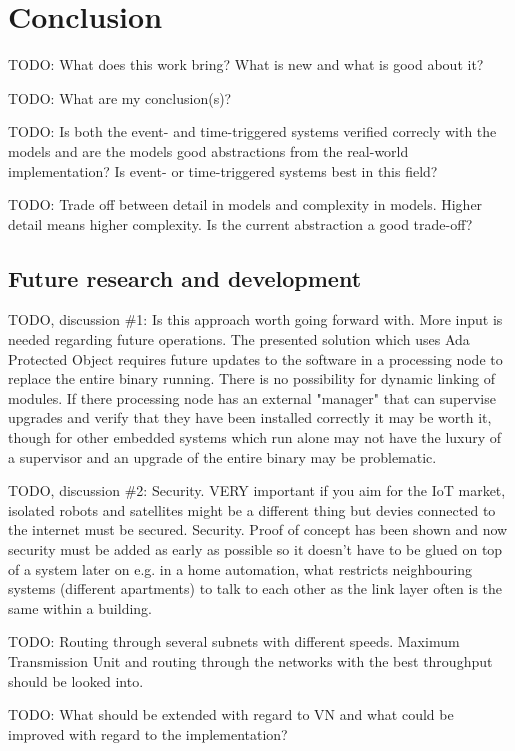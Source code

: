 \chapter{Conclusion}\label{ch:conclusion}
TODO: What does this work bring? What is new and what is good about it?

TODO: What are my conclusion(s)?

TODO: Is both the event- and time-triggered systems verified correcly with the
models and are the models good abstractions from the real-world implementation?
Is event- or time-triggered systems best in this field?

TODO: Trade off between detail in models and complexity in models. Higher
detail means higher complexity. Is the current abstraction a good trade-off?

\section{Future research and development}
TODO, discussion \#1: Is this approach worth going forward with. More input is
needed regarding future operations. The presented solution which uses Ada
Protected Object requires future updates to the software in a processing node
to replace the entire binary running. There is no possibility for dynamic
linking of modules.  If there processing node has an external "manager" that
can supervise upgrades and verify that they have been installed correctly it
may be worth it, though for other embedded systems which run alone may not have
the luxury of a supervisor and an upgrade of the entire binary may be
problematic.

TODO, discussion \#2: Security. VERY important if you aim for the IoT market,
isolated robots and satellites might be a different thing but devies connected
to the internet must be secured. Security. Proof of concept has been shown and
now security must be added as early as possible so it doesn't have to be glued
on top of a system later on e.g. in a home automation, what restricts
neighbouring systems (different apartments) to talk to each other as the link
layer often is the same within a building.

TODO: Routing through several subnets with different speeds. Maximum
Transmission Unit and routing through the networks with the best throughput
should be looked into.

TODO: What should be extended with regard to VN and what could be improved with
regard to the implementation?

